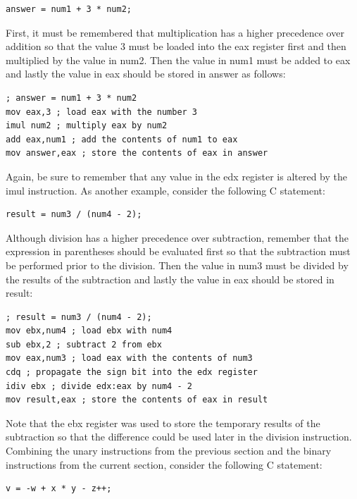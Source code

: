 \documentclass[10pt]{book}
\begin{document}
\begin{verbatim}
answer = num1 + 3 * num2;
\end{verbatim}

First, it must be remembered that multiplication has a higher precedence over addition so that the value 3 must be loaded into the eax register first and then multiplied by the value in num2. Then the value in num1 must be added to eax and lastly the value in eax should be stored in answer as follows:

\begin{verbatim}
; answer = num1 + 3 * num2
mov eax,3 ; load eax with the number 3
imul num2 ; multiply eax by num2
add eax,num1 ; add the contents of num1 to eax
mov answer,eax ; store the contents of eax in answer
\end{verbatim}

Again, be sure to remember that any value in the edx register is altered by the imul instruction. As another example, consider the following C statement:

\begin{verbatim}
result = num3 / (num4 - 2);
\end{verbatim}

Although division has a higher precedence over subtraction, remember that the expression in parentheses should be evaluated first so that the subtraction must be performed prior to the division. Then the value in num3 must be divided by the results of the subtraction and lastly the value in eax should be stored in result:

\begin{verbatim}
; result = num3 / (num4 - 2);
mov ebx,num4 ; load ebx with num4
sub ebx,2 ; subtract 2 from ebx
mov eax,num3 ; load eax with the contents of num3
cdq ; propagate the sign bit into the edx register
idiv ebx ; divide edx:eax by num4 - 2
mov result,eax ; store the contents of eax in result
\end{verbatim}

Note that the ebx register was used to store the temporary results of the subtraction so that the difference could be used later in the division instruction. Combining the unary instructions from the previous section and the binary instructions from the current section, consider the following C statement:

\begin{verbatim}
v = -w + x * y - z++;
\end{verbatim}
\end{document}
